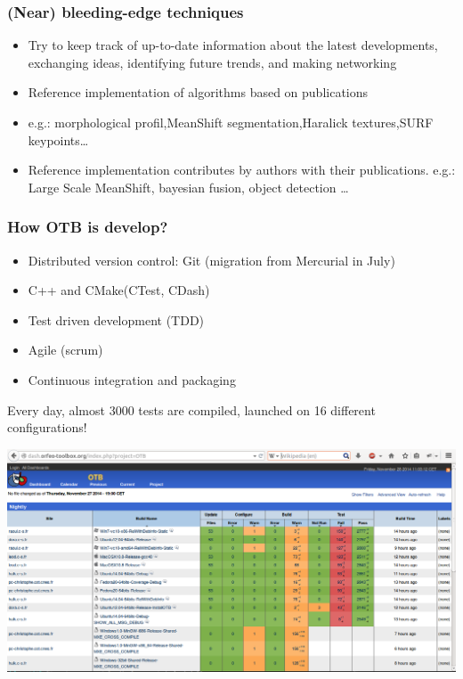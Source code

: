 \documentclass[8pt]{beamer}
\begin{document}
\begin{frame}
\frametitle{(Near) bleeding-edge techniques}
\begin{itemize}
\item Try to keep track of up-to-date information about the latest developments, exchanging ideas, identifying future trends, and making networking
\item Reference implementation of algorithms based on publications
\item e.g.: morphological profil,MeanShift segmentation,Haralick textures,SURF keypoints\ldots
\item Reference implementation contributes by authors with their
  publications. e.g.: Large Scale MeanShift, bayesian fusion, object detection \ldots
\end{itemize}
\end{frame}

\begin{frame}
\frametitle{How OTB is develop?}
\vspace{-0.5cm}
\begin{itemize}
\item Distributed version control: Git (migration from Mercurial in July)
\item C++ and CMake(CTest, CDash)
\item Test driven development (TDD)
\item Agile (scrum)
\item Continuous integration and packaging
\end{itemize}
Every day, almost 3000 tests are compiled, launched on 16 different configurations!
\begin{center}
\href{http://dash.orfeo-toolbox.org/index.php?project=OTB}{\includegraphics[width=\textwidth,trim=0 250 0 0,clip=true]{images/dashboard.png}}
\end{center}
\end{frame}
\end{document}
